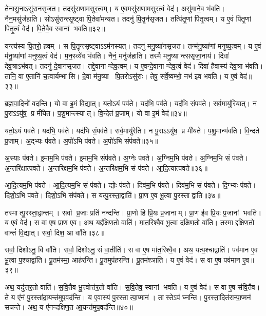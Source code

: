 तेनासु॒नाऽसु॑रानसृजत। तदसु॑राणामसुर॒त्वम्। य ए॒वमसु॑राणामसुर॒त्वं वेद॑। असु॑माने॒व भ॑वति। नैन॒मसु॑र्जहाति। सोऽसु॑रान्त्सृ॒ष्ट्वा पि॒तेवा॑मन्यत। तदनु॑ पि॒तॄन॑सृजत। तत्पि॑तृ॒णां पि॑तृ॒त्वम्। य ए॒वं पि॑तृ॒णां पि॑तृ॒त्वं वेद॑। पि॒तेवै॒व स्वानां भवति॥३२॥

यन्त्य॑स्य पि॒तरो॒ हवम्। स पि॒तॄन्त्सृ॒ष्ट्वाऽऽम॑नस्यत्। तदनु॑ मनु॒ष्या॑नसृजत। तन्म॑नु॒ष्या॑णां मनुष्य॒त्वम्। य ए॒वं म॑नु॒ष्या॑णां मनुष्य॒त्वं वेद॑। म॒न॒स्व्ये॑व भ॑वति। नैनं॒ मनु॑र्जहाति। तस्मै॑ मनु॒ष्यान्त्ससृजा॒नाय॑। दिवा॑ देव॒त्राऽभ॑वत्। तदनु॑ दे॒वान॑सृजत। तद्दे॒वानान्देव॒त्वम्। य ए॒वन्दे॒वानान्देव॒त्वं वेद॑। दिवा॑ है॒वास्य॑ देव॒त्रा भ॑वति। तानि॒ वा ए॒तानि॑ च॒त्वार्यम्भासि। दे॒वा म॑नु॒ष्या पि॒तरोऽसु॑राः। तेषु॒ सर्वे॒ष्वम्भो॒ नभ॑ इव भवति। य ए॒वं वेद॑॥३३॥\anuvakamend[अ॒जी॒व॒त्स्वानां भवति दे॒वान॑सृजत स॒प्त च॑]

ब्र॒ह्म॒वा॒दिनो॑ वदन्ति। यो वा इ॒मं वि॒द्यात्। यतो॒ऽयं पव॑ते। यद॑भि॒ पव॑ते। यद॑भि सं॒पव॑ते। सर्व॒मायु॑रियात्। न पु॒राऽऽयु॑ष॒ प्र मी॑येत। प॒शु॒मान्त्स्यात्। वि॒न्देत॑ प्र॒जाम्। यो वा इ॒मं वेद॑॥३४॥

यतो॒ऽयं पव॑ते। यद॑भि॒ पव॑ते। यद॑भि सं॒पव॑ते। सर्व॒मायु॑रेति। न पु॒राऽऽयु॑ष॒ प्र मी॑यते। प॒शु॒मान्भ॑वति। वि॒न्दते प्र॒जाम्। अ॒द्भ्यः प॑वते। अ॒पो॑ऽभि प॑वते। अ॒पो॑ऽभि संप॑वते॥३५॥

अ॒स्याः प॑वते। इ॒माम॒भि प॑वते। इ॒माम॒भि संप॑वते। अ॒ग्नेः प॑वते। अ॒ग्निम॒भि प॑वते। अ॒ग्निम॒भि सं प॑वते। अ॒न्तरि॑क्षात्पवते। अ॒न्तरि॑क्षम॒भि प॑वते। अ॒न्तरि॑क्षम॒भि सं प॑वते। आ॒दि॒त्यात्प॑वते॥३६॥

आ॒दि॒त्यम॒भि प॑वते। आ॒दि॒त्यम॒भि सं प॑वते। द्योः प॑वते। दिव॑म॒भि प॑वते। दिव॑म॒भि सं प॑वते। दि॒ग्भ्यः प॑वते। दिशो॒ऽभि प॑वते। दिशो॒ऽभि संप॑वते। स यत्पु॒रस्ता॒द्वाति॑। प्रा॒ण ए॒व भू॒त्वा पु॒रस्ताद्वाति॥३७॥

तस्मात्पु॒रस्ता॒द्वान्तम्। सर्वा प्र॒जाः प्रति॑ नन्दन्ति। प्रा॒णो हि प्रि॒यः प्र॒जानाम्। प्रा॒ण इ॑व प्रि॒यः प्र॒जानां भवति। य ए॒वं वेद॑। स वा ए॒ष प्रा॒ण ए॒व। अथ॒ यद्द॑क्षिण॒तो वाति॑। मा॒त॒रिश्वै॒व भू॒त्वा द॑क्षिण॒तो वा॑ति। तस्माद्दक्षिण॒तो वान्तं॑ वि॒द्यात्। सर्वा॒ दिश॒ आ वा॑ति॥३८॥

सर्वा॒ दिशोऽनु॒ वि वा॑ति। सर्वा॒ दिशोऽनु॒ सं वा॒तीति॑। स वा ए॒ष मा॑त॒रिश्वै॒व। अथ॒ यत्प॒श्चाद्वाति॑। पव॑मान ए॒व भू॒त्वा प॒श्चाद्वा॑ति। पू॒तम॑स्मा॒ आह॑रन्ति। पू॒तमुप॑हरन्ति। पू॒तम॑श्ञाति। य ए॒वं वेद॑। स वा ए॒ष पव॑मान ए॒व॥३९॥

अथ॒ यदु॑त्तर॒तो वाति॑। स॒वि॒तैव भू॒त्त्वोत्त॑र॒तो वा॑ति। स॒वि॒तेव॒ स्वानां भवति। य ए॒वं वेद॑। स वा ए॒ष स॑वि॒तैव। ते य ए॑नं पु॒रस्ता॑दा॒यन्त॑मुप॒वद॑न्ति। य ए॒वास्य॑ पु॒रस्तात्पा॒प्मान॑। तास्तेऽप॑ घ्नन्ति। पु॒रस्ता॒दित॑रान्पा॒प्मन॑ सचन्ते। अथ॒ य ए॑नन्दक्षिण॒त आ॒यन्त॑मुप॒वद॑न्ति॥४०॥

